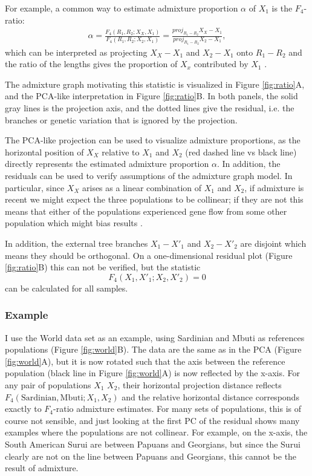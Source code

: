 \documentclass[12pt,fullpage, a4paper]{article}
\newcommand{\vectorproj}[2][]{\textit{proj}_{#1}#2}
\begin{document}
For example, a common way to estimate admixture proportion $\alpha$ of $X_1$ is the $F_4$-ratio:
\begin{eqnarray}
\alpha = \frac{F_4(R_1, R_2; X_X, X_1)}{F_4(R_1, R_2; X_2, X_1)} = \frac{\vectorproj[R_1 - R_2]{X_X - X_1}}{\vectorproj[R_1 - R_2]{X_2 - X_1}} \label{eq:f4ratio},
\end{eqnarray}
which can be interpreted as projecting $X_X-X_1$ and $X_2-X_1$ onto $R_1 - R_2$ and the ratio of the lengths gives the proportion of $X_x$ contributed by $X_1$  \citep{oteo-garcia2021}. 

The admixture graph motivating this statistic is visualized in Figure \ref{fig:ratio}A, and the PCA-like interpretation in Figure \ref{fig:ratio}B. In both panels, the solid gray lines is the projection axis, and the dotted lines give the residual, i.e. the branches or genetic variation that is ignored by the projection. 

The PCA-like projection can be used to visualize admixture proportions, as the horizontal position of $X_X$ relative to $X_1$ and $X_2$ (red dashed line vs black line) directly represents the estimated admixture proportion $\alpha$. In addition, the residuals can be used to verify assumptions of the admixture graph model. In particular, since $X_X$ arises as a linear combination of $X_1$ and $X_2$, if admixture is recent we might expect the three populations to be collinear; if they are not this means that either of the populations experienced gene flow from some other population which might bias results \citep{petr2019}.


In addition, the external tree branches $X_1 - X'_1$ and $X_2 - X'_2$ are disjoint which means they should be orthogonal. On a one-dimensional residual plot (Figure \ref{fig:ratio}B) this can not be verified, but the statistic 
\begin{equation}
F_4(X_1, X'_1; X_2, X'_2) = 0
\end{equation}
can be calculated for all samples.

\subsubsection{Example}
I use the World data set as an example, using Sardinian and Mbuti as references populations (Figure \ref{fig:world}B). The data are the same as in  the PCA (Figure \ref{fig:world}A), but it is now rotated such that the axis between the reference population (black line in Figure \ref{fig:world}A) is now reflected by the x-axis. For any pair of populations $X_1$ $X_2$, their horizontal projection distance reflects $F_4(\text{Sardinian}, \text{Mbuti}; X_1, X_2)$ and the relative horizontal distance corresponds exactly to $F_4$-ratio admixture estimates. For many sets of populations, this is of course not sensible, and just looking at the first PC of the residual shows many examples where the populations are not collinear. For example, on the x-axis, the South American Surui are between Papuans and Georgians, but since the Surui clearly are not on the line between Papuans and Georgians, this cannot be the result of admixture.
\end{document}
